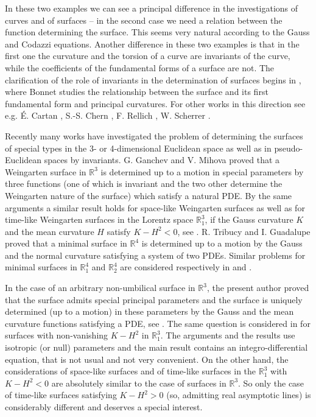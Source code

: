 \documentclass[12pt]{amsart}
\theoremstyle{definition}
\theoremstyle{remark}
\begin{document}
In these two examples we can see a principal difference in the investigations of curves and
of surfaces -- in the second case we need a relation between the function determining
the surface. This seems very natural according to the Gauss and Codazzi equations.
Another difference in these two examples is that in the first one the curvature and the torsion 
of a curve are invariants of the curve, while the coefficients of the fundamental forms of a surface are not.
The clarification of the role of invariants in the determination of surfaces begins in \cite{Bonnet},
where Bonnet studies the relationship between the surface and its first fundamental form and 
principal curvatures. For other works in this direction see e.g. \'E. Cartan \cite{Cartan}, S.-S. Chern  
\cite{Chern}, F. Rellich \cite{Rellich}, W. Scherrer \cite{Scherrer}.
  
Recently many works have investigated the problem of determining the surfaces of special types in the 3- or 4-dimensional Euclidean space
as well as in pseudo-Euclidean spaces by invariants. G. Ganchev and V. Mihova \cite{Ganchev-Mihova} proved that a Weingarten surface in 
$\mathbb R^3$ is determined up to a motion in special parameters 
by three functions (one of which is invariant and the two other determine the Weingarten nature of the surface)
which satisfy
a natural PDE. By the same arguments a similar result  holds for space-like Weingarten surfaces as well
as  for time-like Weingarten surfaces in the Lorentz space $\mathbb R^3_1$, if the Gauss curvature $K$ and the mean curvature $H$
satisfy $K-H^2<0$, see \cite{G-V-2013}. 
R. Tribucy and I. Guadalupe \cite{Tribucy-Guadalupe} proved that 
a minimal surface in $\mathbb R^4$ is determined up to a motion by the Gauss and the normal curvature satisfying a system of two
PDEs. Similar problems for minimal surfaces in $\mathbb R^4_1$ and $\mathbb R^4_2$ are considered respectively in 
\cite{Ganchev-Vel} and \cite{Ganchev-Krassi}. 

In the case of an arbitrary non-umbilical surface in $\mathbb R^3$, the present author proved  that
the surface admits special principal parameters and the surface is uniquely determined (up to a motion)
in these parameters by the Gauss and the mean curvature functions satisfying a PDE, see \cite{OK}.  The same question
is considered in  \cite{K-K-M} for surfaces with non-vanishing $K-H^2$ in $\mathbb R^3_1$. The arguments and the results
use isotropic (or null) parameters and the main result contains an integro-differential equation, that is not usual 
and not very convenient.  On the other hand, the considerations of space-like  surfaces and
of time-like surfaces in the $\mathbb R^3_1$ with $K-H^2<0$ are absolutely similar to the case of surfaces in $\mathbb R^3$.
So only the case of time-like surfaces satisfying $K-H^2>0$ (so, admitting real
asymptotic lines) is considerably different and deserves a special interest.
\end{document}
